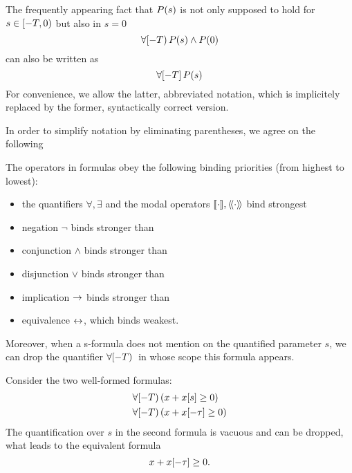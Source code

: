     \begin{convention}
        The frequently appearing fact that $P(s)$ is not only supposed to hold for $s\in[-T,0)$ but also in $s=0$
        \begin{equation*}
            \forall [-T){\,} P(s)\land P(0)
        \end{equation*}
        can also be written as
        \begin{equation*}
            \forall [-T]{\,} P(s)
        \end{equation*}
        For convenience, we allow the latter, abbreviated notation, which is implicitely replaced by the former, syntactically correct version.
    \end{convention}

    In order to simplify notation by eliminating parentheses, we agree on the following
    \begin{convention}
        The operators in \ddL formulas obey the following binding priorities (from highest to lowest):
        \begin{itemize}
            \item the quantifiers $\forall,\exists$ and the modal operators $\dbox{\cdot}{},\ddiamond{\cdot}{}$ bind strongest
            \item negation $\lnot$ binds stronger than
            \item conjunction $\land$ binds stronger than
            \item disjunction $\lor$ binds stronger than
            \item implication $\rightarrow$ binds stronger than
            \item equivalence $\leftrightarrow$, which binds weakest.
        \end{itemize}
    \end{convention}

    Moreover, when a s-formula does not mention on the quantified parameter $s$, we can drop the quantifier $\forall [-T){\,}$ in whose scope this formula appears.

    \begin{example}
        Consider the two well-formed \ddL formulas:
        \begin{align*}
            &\forall [-T){\,} (x+x[s]\geq 0)\\
            &\forall [-T){\,} (x+x[-\tau]\geq 0)
        \end{align*}
        The quantification over $s$ in the second formula is vacuous and can be dropped, what leads to the equivalent formula
        \begin{equation*}
            x+x[-\tau]\geq 0.
        \end{equation*}
    \end{example}


